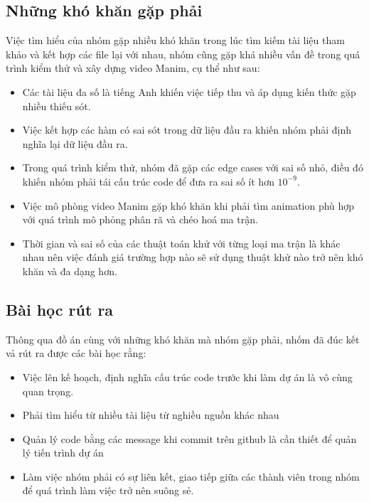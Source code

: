 \documentclass[a4paper]{article}
\begin{document}
\subsection{Những khó khăn gặp phải}
Việc tìm hiểu của nhóm gặp nhiều khó khăn trong lúc tìm kiếm tài liệu tham khảo và kết hợp các file lại với nhau, nhóm cũng gặp khá nhiều vấn đề trong quá trình kiểm thử và xây dựng video Manim, cụ thể như sau:
\begin{itemize}
    \item Các tài liệu đa số là tiếng Anh khiến việc tiếp thu và áp dụng kiến thức gặp nhiều thiếu sót.
    \item Việc kết hợp các hàm có sai sót trong dữ liệu đầu ra khiến nhóm phải định nghĩa lại dữ liệu đầu ra.
    \item  Trong quá trình kiểm thử, nhóm đã gặp các edge cases với sai số nhỏ, điều đó khiến nhóm phải tái cấu trúc code để đưa ra sai số ít hơn $10^{-9}$. 
    \item Việc mô phòng video Manim gặp khó khăn khi phải tìm animation phù hợp với quá trình mô phỏng phân rã và chéo hoá ma trận.
    \item Thời gian và sai số của các thuật toán khử với từng loại ma trận là khác nhau nên việc đánh giá trường hợp nào sẽ sử dụng thuật khử nào trở nên khó khăn và đa dạng hơn.
\end{itemize}

\subsection{Bài học rút ra}
Thông qua đồ án cùng với những khó khăn mà nhóm gặp phải, nhốm đã đúc kết vả rút ra được các bài học rằng:
\begin{itemize}
    \item Việc lên kế hoạch, định nghĩa cấu trúc code trước khi làm dự án là vô cùng quan trọng.
    \item Phải tìm hiểu từ nhiều tài liệu từ nghiều nguồn khác nhau
    \item  Quản lý code bằng các message khi commit trên github là cần thiết để quản lý tiến trình dự án 
    \item Làm việc nhóm phải có sự liên kết, giao tiếp giữa các thành viên trong nhóm để quá trình làm việc trở nên suông sẻ.
\end{itemize}
\end{document}
